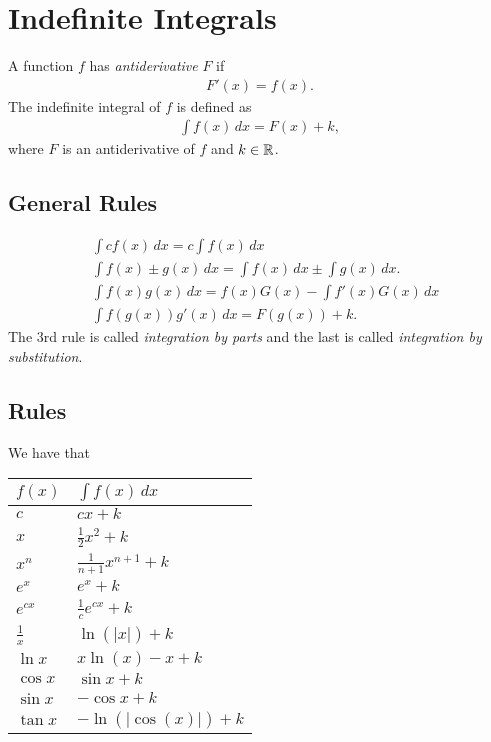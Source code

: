 \section{Indefinite Integrals}
A function $f$ has \emph{antiderivative} $F$ if
\begin{align*}
F'(x)=f(x).
\end{align*}
The indefinite integral of $f$ is defined as
\begin{align*}
\int f(x)\, dx =F(x)+k,
\end{align*}
where $F$ is an antiderivative of $f$ and $k\in \mathbb{R}$.
\subsection{General Rules}
\begin{align*}
&\int cf(x) \, d x=c\int f(x)\, dx\\
&\int f(x)\pm g(x) \, d x=\int f(x)\, dx\pm \int g(x) \, dx.\\
&\int f(x)g(x)\, dx=f(x)G(x)-\int f'(x)G(x)\, dx\\
&\int f(g(x))g'(x)\, dx =F(g(x))+k.
\end{align*}
The 3rd rule is called \emph{integration by parts} and the last is called \emph{integration by substitution}.
\subsection{Rules}
We have that
\begin{center}
		\begin{tabular}{@{}l l@{}}
		$f(x)$      & $\int f(x)\, dx$  				\\ \toprule
		$c$			& $cx+k$ 							\\ \midrule
		$x$			& $\frac{1}{2}x^2+k$				\\ \midrule
		$x^n$  		& $\frac{1}{n+1}x^{n+1}+k$			\\ \midrule
		$e^x$  		& $e^x+k$							\\ \midrule
		$e^{cx}$  	& $\frac{1}{c}e^{cx}+k$				\\ \midrule
		$\frac{1}{x}$ & $\ln(\vert x\vert)+k $			\\ \midrule
		$\ln x$ 	& $x\ln(x)-x+k$						\\ \midrule
		$\cos x$  	& $\sin x+k$						\\ \midrule
		$\sin x$  	& $-\cos x+k$						\\ \midrule
		$\tan x$ 	& $-\ln(\vert \cos(x)\vert)+k$		\\ \bottomrule  
	\end{tabular}
\end{center}
